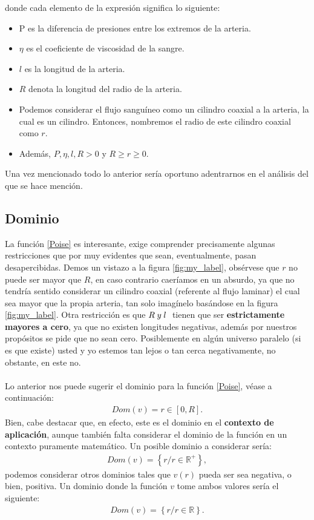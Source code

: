 \vspace{0.5cm}
donde cada elemento de la expresión significa lo siguiente:
\begin{itemize}
    \item P es la diferencia de presiones entre los extremos de la arteria.
    \item $\eta$ es el coeficiente de viscosidad de la sangre.
    \item $l$ es la longitud de la arteria.
    \item $R$ denota la longitud del radio de la arteria.
    \item Podemos considerar el flujo sanguíneo como un cilindro coaxial a la arteria, la cual es un cilindro. Entonces, nombremos el radio de este cilindro coaxial como $r$. 
    \item Además, $P,\eta,l,R>0$ y $R\geq r\geq0.$
\end{itemize}
Una vez mencionado todo lo anterior sería oportuno adentrarnos en el análisis del que se hace mención.
\subsection{Dominio}
La función \ref{Poise} es interesante, exige comprender precisamente algunas restricciones que por muy evidentes que sean, eventualmente, pasan desapercibidas. Demos un vistazo a la figura \ref{fig:my_label}, obsérvese que $r$ no puede ser mayor que $R$, en caso contrario caeríamos en un absurdo, ya que no tendría sentido considerar un cilindro coaxial  (referente al flujo laminar) el cual sea mayor que la propia arteria, tan solo imagínelo basándose en la figura \ref{fig:my_label}. Otra restricción es que $R \hspace{0.09cm} y \hspace{0.09cm}l\hspace{0.1cm}$ tienen que ser \textbf{estrictamente mayores a cero}, ya que no existen longitudes negativas, además por nuestros propósitos se pide que no sean cero. Posiblemente en algún universo paralelo (si es que existe) usted y yo estemos tan lejos o tan cerca negativamente, no obstante, en este no.\\ \\
Lo anterior nos puede sugerir el dominio para la función \ref{Poise}, véase a continuación:
\begin{align}
    Dom(v)=r\in \left[0,R\right]. \label{dom1}
\end{align}
Bien, cabe destacar que, en efecto, este es el dominio en el \textbf{contexto de aplicación}, aunque también falta considerar el dominio de la función en un contexto puramente matemático. Un posible dominio a considerar sería:
\begin{align}
    Dom(v)=\left\lbrace
    r/r\in \mathbb{R^+}
    \right\rbrace, \label{dom2}
\end{align}
podemos considerar otros dominios tales que $v(r)$ pueda ser sea negativa, o bien, positiva. Un dominio donde la función $v$ tome ambos valores sería el siguiente:
\begin{align}
    Dom(v)=\left\lbrace
    r/r\in \mathbb{R}
    \right\rbrace. \label{dom3}
\end{align}
